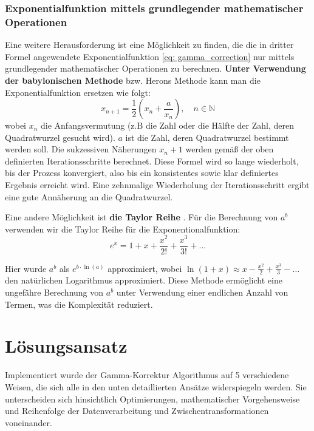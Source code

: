 \documentclass[course=erap]{aspdoc}
\begin{document}
\subsubsection{Exponentialfunktion mittels grundlegender mathematischer Operationen}
Eine weitere Herausforderung ist eine Möglichkeit zu finden, die die in dritter Formel angewendete Exponentialfunktion \eqref{eq: gamma_correction} nur mittels grundlegender mathematischer Operationen zu berechnen. \textbf{Unter Verwendung der babylonischen Methode} \cite{BabylMeth} bzw. Herons Methode kann man die Exponentialfunktion ersetzen wie folgt:
\begin{equation}
    x_{n+1} = \frac{1}{2} \left( x_n + \frac{a}{x_n} \right),  \quad n \in \mathbb{N} \label{eq: bab_meth}
\end{equation}
wobei $x_n$ die Anfangsvermutung (z.B die Zahl oder die Hälfte der Zahl, deren Quadratwurzel gesucht wird). $a$ ist die Zahl, deren Quadratwurzel bestimmt werden soll. Die sukzessiven Näherungen $x_n+1$ werden gemäß der oben definierten Iterationsschritte berechnet. Diese Formel wird so lange wiederholt, bis der Prozess konvergiert, also bis ein konsistentes sowie klar definiertes Ergebnis erreicht wird. Eine zehnmalige Wiederholung der Iterationsschritt ergibt eine gute Annäherung an die Quadratwurzel. \par
Eine andere Möglichkeit ist \textbf{die Taylor Reihe} \cite{TaylorReih}. Für die Berechnung von \(a^b\) verwenden wir die Taylor Reihe für die Exponentionalfunktion: 
 \begin{equation}
    e^x = 1 + x + \frac{x^2}{2!} + \frac{x^3}{3!} + \ldots \label{eq:Taylor-Reihe}
\end{equation}

Hier wurde \(a^b\) als \(e^{b \cdot \ln(a)}\) approximiert, wobei \(\ln(1+x) \approx x - \frac{x^2}{2} + \frac{x^3}{3} - \ldots\) den natürlichen Logarithmus approximiert. Diese Methode ermöglicht eine ungefähre Berechnung von  \(a^b\) unter Verwendung einer endlichen Anzahl von Termen, was die Komplexität reduziert. 

\section{Lösungsansatz}
Implementiert wurde der Gamma-Korrektur Algorithmus auf 5 verschiedene Weisen, die sich alle in den unten detaillierten Ansätze widerspiegeln werden. Sie unterscheiden sich hinsichtlich Optimierungen, mathematischer Vorgehensweise und Reihenfolge der Datenverarbeitung und Zwischentransformationen voneinander.  
\end{document}
